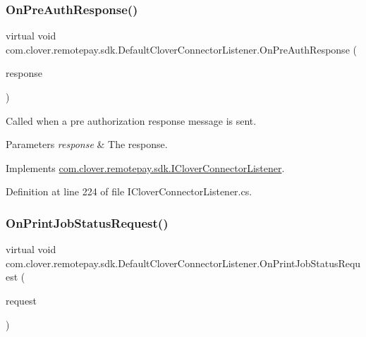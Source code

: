 \subsubsection{\texorpdfstring{On\+Pre\+Auth\+Response()}{OnPreAuthResponse()}}
{\footnotesize\ttfamily virtual void com.\+clover.\+remotepay.\+sdk.\+Default\+Clover\+Connector\+Listener.\+On\+Pre\+Auth\+Response (\begin{DoxyParamCaption}\item[{\hyperlink{classcom_1_1clover_1_1remotepay_1_1sdk_1_1_pre_auth_response}{Pre\+Auth\+Response}}]{response }\end{DoxyParamCaption})\hspace{0.3cm}{\ttfamily [virtual]}}



Called when a pre authorization response message is sent. 


\begin{DoxyParams}{Parameters}
{\em response} & The response.\\
\hline
\end{DoxyParams}


Implements \hyperlink{interfacecom_1_1clover_1_1remotepay_1_1sdk_1_1_i_clover_connector_listener_ad3fd2383d245798a6da5f11bbc3dd5fc}{com.\+clover.\+remotepay.\+sdk.\+I\+Clover\+Connector\+Listener}.



Definition at line 224 of file I\+Clover\+Connector\+Listener.\+cs.

\mbox{\label{classcom_1_1clover_1_1remotepay_1_1sdk_1_1_default_clover_connector_listener_a739a8523907057a33f0babacef2b1336}} 
\subsubsection{\texorpdfstring{On\+Print\+Job\+Status\+Request()}{OnPrintJobStatusRequest()}}
{\footnotesize\ttfamily virtual void com.\+clover.\+remotepay.\+sdk.\+Default\+Clover\+Connector\+Listener.\+On\+Print\+Job\+Status\+Request (\begin{DoxyParamCaption}\item[{\hyperlink{classcom_1_1clover_1_1remotepay_1_1sdk_1_1_print_job_status_request}{Print\+Job\+Status\+Request}}]{request }\end{DoxyParamCaption})\hspace{0.3cm}{\ttfamily [virtual]}}



